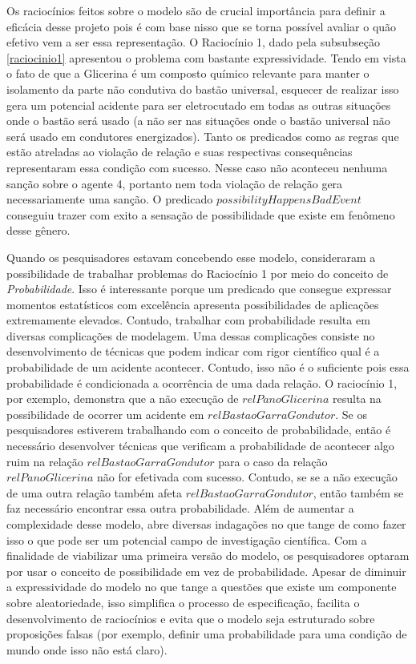 Os raciocínios feitos sobre o modelo são de crucial importância para definir a eficácia desse projeto pois é com base nisso que se torna possível avaliar o quão 
efetivo vem a ser essa representação. O Raciocínio 1, dado pela subsubseção \ref{raciocinio1} apresentou o problema com bastante expressividade. Tendo em vista o fato de que a Glicerina 
é um composto químico relevante para manter o isolamento da parte não condutiva do bastão universal, esquecer de realizar isso gera um potencial acidente para ser eletrocutado em todas 
as outras situações onde o bastão será usado (a não ser nas situações onde o bastão universal não será usado em condutores energizados). Tanto os predicados como as regras que estão
atreladas ao violação de relação e suas respectivas consequências representaram essa condição com sucesso. Nesse caso não aconteceu nenhuma sanção sobre o agente 4, portanto nem toda 
violação de relação gera necessariamente uma sanção. O predicado $possibilityHappensBadEvent$ conseguiu trazer com exito a sensação de possibilidade que existe em fenômeno desse gênero. 

Quando os pesquisadores estavam concebendo esse modelo, consideraram a possibilidade de trabalhar problemas do Raciocínio 1 por meio do conceito de \textit{Probabilidade}. Isso é interessante 
porque um predicado que consegue expressar momentos estatísticos com excelência apresenta possibilidades de aplicações extremamente elevados. Contudo, trabalhar com probabilidade resulta 
em diversas complicações de modelagem. Uma dessas complicações consiste no desenvolvimento de técnicas que podem indicar com rigor científico qual é a probabilidade de um acidente acontecer. 
Contudo, isso não é o suficiente pois essa probabilidade é condicionada a ocorrência de uma dada relação. O raciocínio 1, por exemplo, demonstra que a não execução de $relPanoGlicerina$ resulta 
na possibilidade de ocorrer um acidente em $relBastaoGarraGondutor$. Se os pesquisadores estiverem trabalhando com o conceito de probabilidade, então é necessário desenvolver técnicas que 
verificam a probabilidade de acontecer algo ruim na relação $relBastaoGarraGondutor$ para o caso da relação $relPanoGlicerina$ não for efetivada com sucesso. Contudo, se se a não execução de uma 
outra relação também afeta $relBastaoGarraGondutor$, então também se faz necessário encontrar essa outra probabilidade. Além de aumentar a complexidade desse modelo, abre diversas indagações 
no que tange de como fazer isso o que pode ser um potencial campo de investigação científica. Com a finalidade de viabilizar uma primeira versão do modelo, os pesquisadores optaram por 
usar o conceito de possibilidade em vez de probabilidade. Apesar de diminuir a expressividade do modelo no que tange a questões que existe um componente sobre aleatoriedade, isso simplifica 
o processo de especificação, facilita o desenvolvimento de raciocínios e evita que o modelo seja estruturado sobre proposições falsas (por exemplo, definir uma probabilidade para uma condição 
de mundo onde isso não está claro). 

